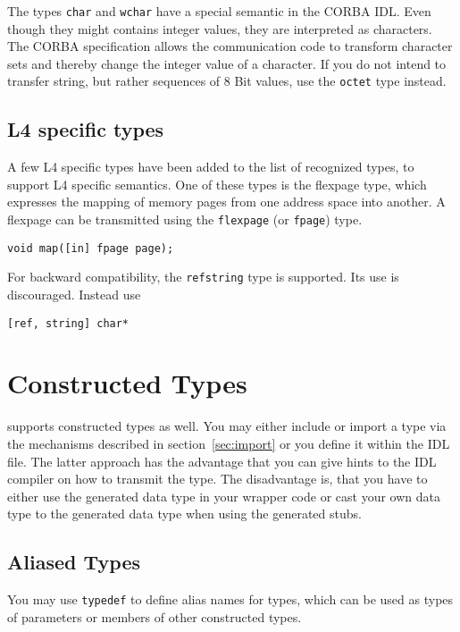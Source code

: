 The types {\tt char} and {\tt wchar} have a special semantic in the CORBA IDL.
Even though they might contains integer values, they are interpreted as
characters. The CORBA specification allows the communication code to transform
character sets and thereby change the integer value of a character. If you do
not intend to transfer string, but rather sequences of 8 Bit values, use the
{\tt octet} type instead.

\subsection{L4 specific types}

A few L4 specific types have been added to the list of recognized types, to
support L4 specific semantics.  One of these types is the flexpage type, which
expresses the mapping of memory pages from one address space into another.  A
flexpage can be transmitted using the {\tt flexpage} (or {\tt fpage}) type.

\begin{verbatim}
void map([in] fpage page);
\end{verbatim}

For backward compatibility, the {\tt refstring} type is supported. Its use is
discouraged. Instead use

\begin{verbatim}
[ref, string] char*
\end{verbatim}

\section{Constructed Types}

\dice{} supports constructed types as well. You may either include or import a
type via the mechanisms described in section~\ref{sec:import} or you define it
within the IDL file. The latter approach has the advantage that you can give
hints to the IDL compiler on how to transmit the type. The disadvantage is,
that you have to either use the generated data type in your wrapper code or
cast your own data type to the generated data type when using the generated
stubs.

\subsection{Aliased Types}

You may use {\tt typedef} to define alias names for types, which can be used
as types of parameters or members of other constructed types.

